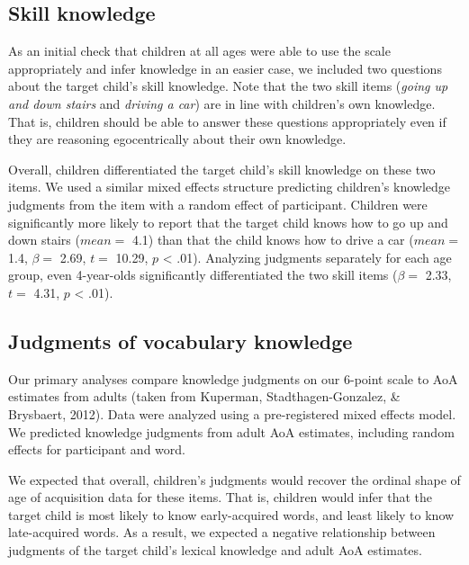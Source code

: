 \documentclass[10pt, letterpaper]{article}
\begin{document}
\hypertarget{skill-knowledge}{%
\subsection{Skill knowledge}\label{skill-knowledge}}

As an initial check that children at all ages were able to use the scale
appropriately and infer knowledge in an easier case, we included two
questions about the target child's skill knowledge. Note that the two
skill items (\emph{going up and down stairs} and \emph{driving a car})
are in line with children's own knowledge. That is, children should be
able to answer these questions appropriately even if they are reasoning
egocentrically about their own knowledge.

Overall, children differentiated the target child's skill knowledge on
these two items. We used a similar mixed effects structure predicting
children's knowledge judgments from the item with a random effect of
participant. Children were significantly more likely to report that the
target child knows how to go up and down stairs (\(mean =\) 4.1) than
that the child knows how to drive a car (\(mean =\) 1.4, \(\beta =\)
2.69, \(t =\) 10.29, \(p\) \textless{} .01). Analyzing judgments
separately for each age group, even 4-year-olds significantly
differentiated the two skill items (\(\beta =\) 2.33, \(t =\) 4.31,
\(p\) \textless{} .01).

\hypertarget{judgments-of-vocabulary-knowledge}{%
\subsection{Judgments of vocabulary
knowledge}\label{judgments-of-vocabulary-knowledge}}

Our primary analyses compare knowledge judgments on our 6-point scale to
AoA estimates from adults (taken from Kuperman, Stadthagen-Gonzalez, \&
Brysbaert, 2012). Data were analyzed using a pre-registered mixed
effects model. We predicted knowledge judgments from adult AoA
estimates, including random effects for participant and word.

We expected that overall, children's judgments would recover the ordinal
shape of age of acquisition data for these items. That is, children
would infer that the target child is most likely to know early-acquired
words, and least likely to know late-acquired words. As a result, we
expected a negative relationship between judgments of the target child's
lexical knowledge and adult AoA estimates.
\end{document}
